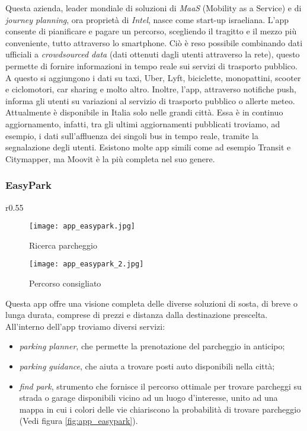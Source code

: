  Questa azienda, leader mondiale di soluzioni di \textit{MaaS} (Mobility as a Service) e di \textit{journey planning}, ora proprietà di \textit{Intel}, nasce come start-up israeliana. L'app consente di pianificare e pagare un percorso, scegliendo il tragitto e il mezzo più conveniente, tutto attraverso lo smartphone. Ciò è reso possibile combinando dati ufficiali a \textit{crowdsourced data} (dati ottenuti dagli utenti attraverso la rete), questo permette di fornire informazioni in tempo reale sui servizi di trasporto pubblico. A questo si aggiungono i dati su taxi, Uber, Lyft, biciclette, monopattini, scooter e ciclomotori, car sharing e molto altro. Inoltre, l'app, attraverso notifiche push, informa gli utenti su variazioni al servizio di trasporto pubblico o allerte meteo. 
 Attualmente è disponibile in Italia solo nelle grandi città. Essa è in continuo aggiornamento, infatti, tra gli ultimi aggiornamenti pubblicati troviamo, ad esempio, i dati sull'affluenza dei singoli bus in tempo reale, tramite la segnalazione degli utenti. 
 Esistono molte app simili come ad esempio Transit e Citymapper, ma Moovit è la più completa nel suo genere.

\subsubsection{EasyPark}

\begin{wrapfigure}{r}{0.55\textwidth}
    \centering 
\begin{subfigure}{0.23\textwidth}
\centering
\texttt{[image: app\_easypark.jpg]}
\caption{Ricerca parcheggio}
\label{fig:app_easypark_1}
\end{subfigure}\hfil
\begin{subfigure}{0.23\textwidth}
\centering
\texttt{[image: app\_easypark\_2.jpg]}
\caption{Percorso consigliato}
\label{fig:app_easypark_2}
\end{subfigure}
\caption{
\label{fig:app_easypark}App EasyPark}
\end{wrapfigure}

Questa app offre una visione completa delle diverse soluzioni di sosta, di breve o lunga durata, comprese di prezzi e distanza dalla destinazione prescelta. All'interno dell'app troviamo diversi servizi:
\begin{itemize}
    \item \textit{parking planner}, che permette la prenotazione del parcheggio in anticipo;
    \item \textit{parking guidance}, che aiuta a trovare posti auto disponibili nella città;
    \item  \textit{find park}, strumento che fornisce il percorso ottimale per trovare parcheggi su strada o garage disponibili vicino ad un luogo d'interesse, unito ad una mappa in cui i colori delle vie chiariscono la probabilità di trovare parcheggio (Vedi figura \ref{fig:app_easypark}).
\end{itemize} 


